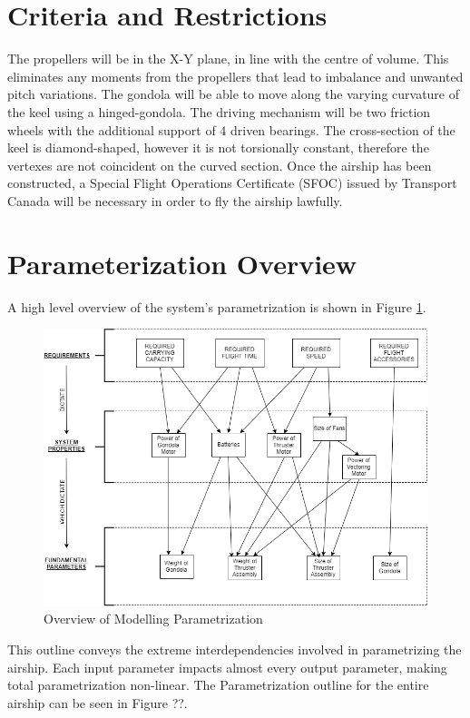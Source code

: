 \documentclass[../main.tex]{subfiles}
\begin{document}
\section{Criteria and Restrictions}
The propellers will be in the X-Y plane, in line with the centre of volume. This eliminates any moments from the propellers that lead to imbalance and unwanted pitch variations. The gondola will be able to move along the varying curvature of the keel using a hinged-gondola. The driving mechanism will be two friction wheels with the additional support of 4 driven bearings. The cross-section of the keel is diamond-shaped, however it is not torsionally constant, therefore the vertexes are not coincident on the curved section. Once the airship has been constructed, a Special Flight Operations Certificate (SFOC) issued by Transport Canada will be necessary in order to fly the airship lawfully.

\section{Parameterization Overview}
A high level overview of the system's parametrization is shown in Figure \ref{fig:ModellingOutline}.

\begin{figure}[H]
	\centering
	\includegraphics[width=\textwidth]{img/paramaterization/Brief_Overview.png}
	\caption{Overview of Modelling Parametrization}
	\label{fig:ModellingOutline}
\end{figure}

This outline conveys the extreme interdependencies involved in parametrizing the airship. Each input parameter impacts almost every output parameter, making total parametrization non-linear. The Parametrization outline for the entire airship can be seen in Figure ??.
\end{document}
